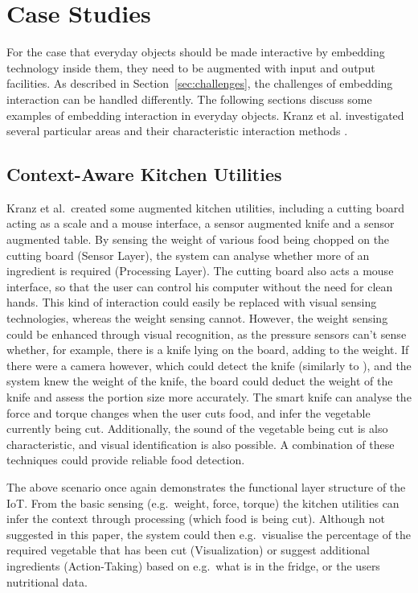 \section{Case Studies}
\label{sec:caseStudies}
For the case that everyday objects should be made interactive by embedding technology inside them, they need to be augmented with input and output facilities.
As described in Section~\ref{sec:challenges}, the challenges of embedding interaction can be handled differently.
The following sections discuss some examples of embedding interaction in everyday objects.
Kranz et al. investigated several particular areas and their characteristic interaction methods \cite{kranz10}.

\subsection{Context-Aware Kitchen Utilities}
Kranz et al.\ created some augmented kitchen utilities, including a cutting board acting as a scale and a mouse interface, a sensor augmented knife and a sensor augmented table.
By sensing the weight of various food being chopped on the cutting board (Sensor Layer), the system can analyse whether more of an ingredient is required (Processing Layer).
The cutting board also acts a mouse interface, so that the user can control his computer without the need for clean hands.
This kind of interaction could easily be replaced with visual sensing technologies, whereas the weight sensing cannot.
However, the weight sensing could be enhanced through visual recognition, as the pressure sensors can't sense whether, for example, there is a knife lying on the board, adding to the weight.
If there were a camera however, which could detect the knife (similarly to \cite{corsten13}), and the system knew the weight of the knife, the board could deduct the weight of the knife and assess the portion size more accurately.
The smart knife can analyse the force and torque changes when the user cuts food, and infer the vegetable currently being cut.
Additionally, the sound of the vegetable being cut is also characteristic, and visual identification is also possible.
A combination of these techniques could provide reliable food detection.

The above scenario once again demonstrates the functional layer structure of the IoT.
From the basic sensing (e.g.\ weight, force, torque) the kitchen utilities can infer the context through processing (which food is being cut).
Although not suggested in this paper, the system could then e.g.\ visualise the percentage of the required vegetable that has been cut (Visualization) or suggest additional ingredients (Action-Taking) based on e.g.\ what is in the fridge, or the users nutritional data.

